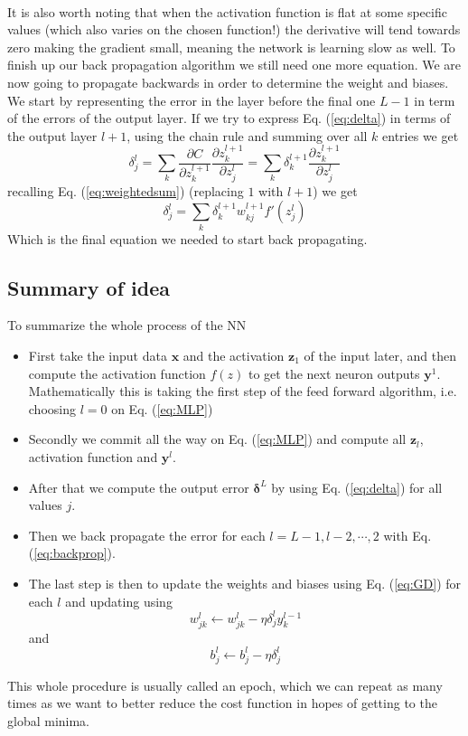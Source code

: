 \documentclass[14pt, a4paper]{book}
\begin{document}
\\It is also worth noting that when the activation function is flat at some specific values (which also varies on the chosen function!) the derivative will tend towards zero making the gradient small, 
meaning the network is learning slow as well. To finish up our back propagation algorithm we still need one more equation. We are now going to propagate backwards in order to determine the weight and biases. 
We start by representing the error in the layer before the final one $L-1$ in term of the errors of the output layer. If we try to express Eq. (\ref{eq:delta}) in terms of the output layer $l+1$, 
using the chain rule and summing over all $k$ entries we get
$$
\delta_j^l=\sum_k\frac{\partial C}{\partial z_k^{l+1}}\frac{\partial z_k^{l+1}}{\partial z_j^l} =\sum_k \delta_k^{l+1}\frac{\partial z_k^{l+1}}{\partial z_j^l}
$$
recalling Eq. (\ref{eq:weightedsum}) (replacing $1$ with $l+1$) we get
\begin{equation}\label{eq:backprop}
    \delta_j^l=\sum_k\delta_k^{l+1}w_{kj}^{l+1}f'(z_j^l)
\end{equation}
Which is the final equation we needed to start back propagating. 

\subsection{Summary of idea}
To summarize the whole process of the NN
\begin{itemize}
    \item First take the input data $\mathbf{x}$ and the activation $\mathbf{z}_1$ of the input later, and then compute the activation function $f(z)$ to get the next neuron outputs $\mathbf{y}^1$. Mathematically this is taking the first step of the feed forward algorithm, i.e. choosing $l=0$ on Eq. (\ref{eq:MLP})
    \item Secondly we commit all the way on Eq. (\ref{eq:MLP}) and compute all $\mathbf{z}_l$, activation function and $\mathbf{y}^l$.
    \item After that we compute the output error $\bm{\delta}^L$ by using Eq. (\ref{eq:delta}) for all values $j$.
    \item Then we back propagate the error for each $l=L-1,l-2,\cdots,2$ with Eq. (\ref{eq:backprop}).
    \item The last step is then to update the weights and biases using Eq. (\ref{eq:GD}) for each $l$ and updating using
    $$
    w_{jk}^l\leftarrow w_{jk}^l-\eta\delta_j^ly_k^{l-1}
    $$
    and
    $$
    b_j^l \leftarrow b_j^l-\eta\delta_j^l
    $$
\end{itemize}
This whole procedure is usually called an epoch, which we can repeat as many times as we want to better reduce the cost function in hopes of getting to the global minima.
\end{document}
